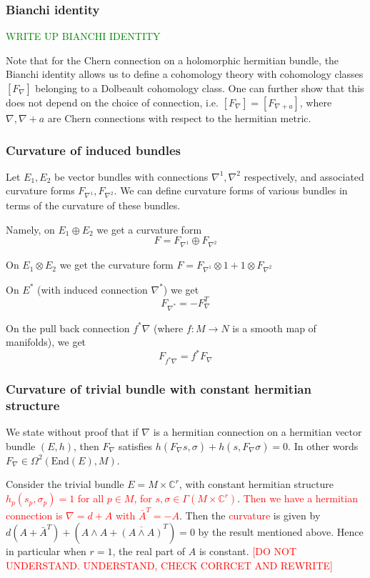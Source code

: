\documentclass[a4paper]{article}
\theoremstyle{definition} \newtheorem*{definition}{Definition}
\theoremstyle{definition} \newtheorem*{definitions}{Definitions}
\theoremstyle{plain} \newtheorem{theorem}{Theorem}[section]
\theoremstyle{plain} \newtheorem{proposition}[theorem]{Proposition}
\theoremstyle{plain} \newtheorem{corollary}[theorem]{Corollary}
\theoremstyle{plain} \newtheorem{lemma}[theorem]{Lemma}
\theoremstyle{plain} \newtheorem{example}[theorem]{Example}
\newcommand{\checkCorrect}[1]{\textcolor{red}{#1}}
\newcommand{\finish}[1]{\textcolor{green}{#1}}
\newcommand{\complexnos}{\mathbb{C}}
\newcommand{\End}{\text{End}}
\begin{document}
\subsubsection{Bianchi identity}
\finish{WRITE UP BIANCHI IDENTITY}

Note that for the Chern connection on a holomorphic hermitian bundle, the Bianchi identity allows us to define a cohomology theory with cohomology classes $[F_\nabla]$ belonging to a Dolbeault cohomology class. One can further show that this does not depend on the choice of connection, i.e. $[F_\nabla]=[F_{\nabla+a}]$, where $\nabla, \nabla+a$ are Chern connections with respect to the hermitian metric. 

\subsubsection{Curvature of induced bundles}
Let $E_1, E_2$ be vector bundles with connections $\nabla^1, \nabla^2$ respectively, and associated curvature forms $F_{\nabla^1}, F_{\nabla^2}$. We can define curvature forms of various bundles in terms of the curvature of these bundles. 

Namely, on $E_1\oplus E_2$ we get a  curvature form
$$F = F_{\nabla^1}\oplus F_{\nabla^2}$$

On $E_1\otimes E_2$ we get the curvature form
$F=F_{\nabla^1}\otimes 1 + 1\otimes F_{\nabla^2}$

On $E^*$ (with induced connection $\nabla^*$) we get
$$F_{\nabla^*}=-F_{\nabla}^T$$

On the pull back connection $f^*\nabla$ (where $f:M\to N$ is a smooth map of manifolds), we get
$$F_{f^* \nabla} = f^* F_\nabla$$

\subsubsection{Curvature of trivial bundle with constant hermitian structure}
We state without proof that if $\nabla$ is a hermitian connection on a hermitian vector bundle $(E, h)$, then $F_\nabla$ satisfies $h(F_\nabla s, \sigma)+h(s, F_\nabla \sigma)=0$. In other words $F_\nabla\in \Omega^2(\End(E), M)$.

Consider the trivial bundle $E=M\times \complexnos^r$, with constant hermitian structure \checkCorrect{$h_p(s_p, \sigma_p)=1$ for all $p\in M$, for $s, \sigma\in \Gamma(M\times \complexnos^r)$}. \checkCorrect{Then we have a hermitian connection is $\nabla=d+A$ with $\bar{A}^T=-A$}. Then the \checkCorrect{curvature} is given by $d(A+\bar{A}^T)+(A\wedge A +\overline{(A\wedge A)}^T)=0$ by the result mentioned above. Hence in particular when $r=1$, the real part of $A$
 is constant. 
 \checkCorrect{[DO NOT UNDERSTAND. UNDERSTAND, CHECK CORRCET AND REWRITE]}
\end{document}
